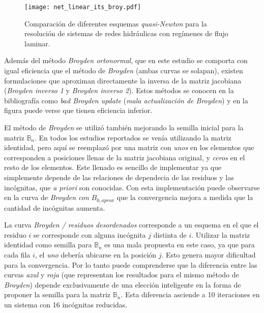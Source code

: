 \begin{figure}[ht]
\centering
\texttt{[image: net\_linear\_its\_broy.pdf]}
\caption[Comparación de diferentes esquemas \textit{quasi-Newton} para la resolución de sistemas de redes hidráulicas con regímenes de flujo laminar]
{Comparación de diferentes esquemas \textit{quasi-Newton} para la resolución de sistemas de redes hidráulicas con regímenes de flujo laminar.}
	\label{net_linear_its_broy}
\end{figure}

Además del método \textit{Broyden ortonormal}, que en este estudio se comporta con igual eficiencia que el método de \textit{Broyden} (ambas curvas se solapan),
existen formulaciones que aproximan directamente la inversa de la matriz jacobiana (\textit{Broyden inverso 1} y \textit{Broyden inverso 2}).
Estos métodos se conocen en la bibliografía como \textit{bad Broyden update} (\textit{mala actualización de Broyden}) \cite{griewank} y en la figura puede verse que tienen eficiencia inferior.

El método de \textit{Broyden} se utilizó también mejorando la semilla inicial para la matriz $\mathbb{B}_n$.
En todos los estudios reportados se venía utilizando la matriz identidad,
pero aquí se reemplazó por una matriz con \textit{unos} en los elementos que corresponden a posiciones llenas de la matriz jacobiana original,
y \textit{ceros} en el resto de los elementos.
Este llenado es sencillo de implementar ya que simplemente depende de las relaciones de dependecia de las residuos y las incógnitas, que \textit{a priori} son conocidas.
Con esta implementación puede observarse en la curva de \textit{Broyden con} $B_{0,aprox}$ que la convergencia mejora a medida que la cantidad de incógnitas aumenta.

La curva \textit{Broyden / residuos desordenados} corresponde a un esquema en el que el residuo $i$ se corresponde con alguna incógnita $j$ distinta de $i$.
Utilizar la matriz identidad como semilla para $\mathbb{B}_n$ es una mala propuesta en este caso,
ya que para cada fila $i$, el \textit{uno} debería ubicarse en la posición $j$.
Esto genera mayor dificultad para la convergencia.
Por lo tanto puede comprenderse que la diferencia entre las curvas \textit{azul} y \textit{roja} (que representan los resultados para el mismo método de \textit{Broyden})
depende exclusivamente de una elección inteligente en la forma de proponer la semilla para la matriz $\mathbb{B}_n$.
Esta diferencia asciende a 10 iteraciones en un sistema con 16 incógnitas reducidas.

